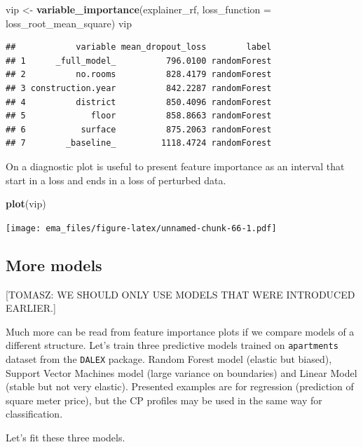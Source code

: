 \documentclass[12pt,]{krantz}
\newenvironment{Shaded}{\begin{snugshade}}{\end{snugshade}}
\newcommand{\DataTypeTok}[1]{\textcolor[rgb]{0.13,0.29,0.53}{#1}}
\newcommand{\KeywordTok}[1]{\textcolor[rgb]{0.13,0.29,0.53}{\textbf{#1}}}
\newcommand{\NormalTok}[1]{#1}
\newcommand{\StringTok}[1]{\textcolor[rgb]{0.31,0.60,0.02}{#1}}
\begin{document}
\begin{Shaded}
\begin{Highlighting}[]
\NormalTok{vip <-}\StringTok{ }\KeywordTok{variable_importance}\NormalTok{(explainer_rf, }
            \DataTypeTok{loss_function =}\NormalTok{ loss_root_mean_square)}
\NormalTok{vip}
\end{Highlighting}
\end{Shaded}

\begin{verbatim}
##            variable mean_dropout_loss        label
## 1      _full_model_          796.0100 randomForest
## 2          no.rooms          828.4179 randomForest
## 3 construction.year          842.2287 randomForest
## 4          district          850.4096 randomForest
## 5             floor          858.8663 randomForest
## 6           surface          875.2063 randomForest
## 7        _baseline_         1118.4724 randomForest
\end{verbatim}

On a diagnostic plot is useful to present feature importance as an interval that start in a loss and ends in a loss of perturbed data.

\begin{Shaded}
\begin{Highlighting}[]
\KeywordTok{plot}\NormalTok{(vip)}
\end{Highlighting}
\end{Shaded}

\texttt{[image: ema\_files/figure-latex/unnamed-chunk-66-1.pdf]}

\hypertarget{more-models}{%
\subsection{More models}\label{more-models}}

{[}TOMASZ: WE SHOULD ONLY USE MODELS THAT WERE INTRODUCED EARLIER.{]}

Much more can be read from feature importance plots if we compare models of a different structure.
Let's train three predictive models trained on \texttt{apartments} dataset from the \texttt{DALEX} package. Random Forest model \citep{R-randomForest} (elastic but biased), Support Vector Machines model \citep{R-e1071} (large variance on boundaries) and Linear Model (stable but not very elastic).
Presented examples are for regression (prediction of square meter price), but the CP profiles may be used in the same way for classification.

Let's fit these three models.
\end{document}
